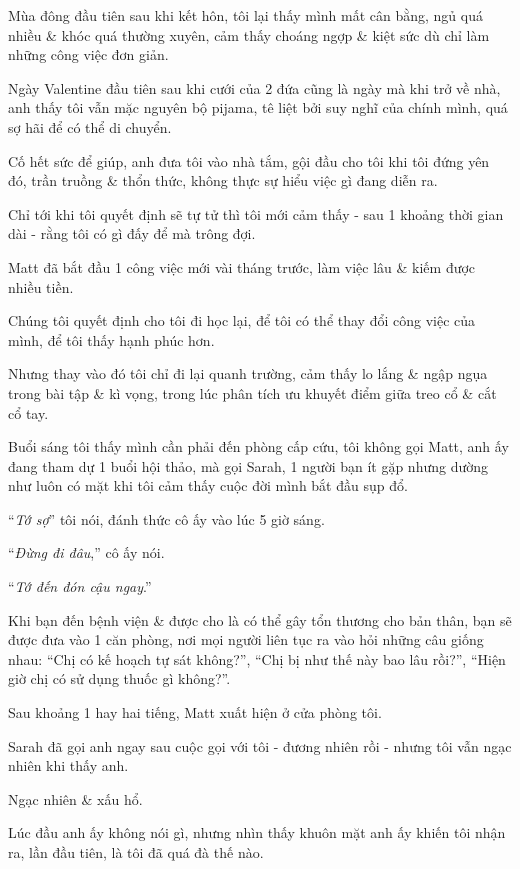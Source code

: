 \documentclass{article}
\begin{document}
Mùa đông đầu tiên sau khi kết hôn, tôi lại thấy mình mất cân bằng, ngủ quá nhiều \& khóc quá thường xuyên, cảm thấy choáng ngợp \& kiệt sức dù chỉ làm những công việc đơn giản.

%
Ngày Valentine đầu tiên sau khi cưới của 2 đứa cũng là ngày mà khi trở về nhà, anh thấy tôi vẫn mặc nguyên bộ pijama, tê liệt bởi suy nghĩ của chính mình, quá sợ hãi để có thể di chuyển.

Cố hết sức để giúp, anh đưa tôi vào nhà tắm, gội đầu cho tôi khi tôi đứng yên đó, trần truồng \& thổn thức, không thực sự hiểu việc gì đang diễn ra.

Chỉ tới khi tôi quyết định sẽ tự tử thì tôi mới cảm thấy - sau 1 khoảng thời gian dài - rằng tôi có gì đấy để mà trông đợi.

Matt đã bắt đầu 1 công việc mới vài tháng trước, làm việc lâu \& kiếm được nhiều tiền.

Chúng tôi quyết định cho tôi đi học lại, để tôi có thể thay đổi công việc của mình, để tôi thấy hạnh phúc hơn.

Nhưng thay vào đó tôi chỉ đi lại quanh trường, cảm thấy lo lắng \& ngập ngụa trong bài tập \& kì vọng, trong lúc phân tích ưu khuyết điểm giữa treo cổ \& cắt cổ tay.

%
Buổi sáng tôi thấy mình cần phải đến phòng cấp cứu, tôi không gọi Matt, anh ấy đang tham dự 1 buổi hội thảo, mà gọi Sarah, 1 người bạn ít gặp nhưng dường như luôn có mặt khi tôi cảm thấy cuộc đời mình bắt đầu sụp đổ.

%
``\textit{Tớ sợ}'' tôi nói, đánh thức cô ấy vào lúc 5 giờ sáng.

%
``\textit{Đừng đi đâu},'' cô ấy nói.

``\textit{Tớ đến đón cậu ngay}.''

%
Khi bạn đến bệnh viện \& được cho là có thể gây tổn thương cho bản thân, bạn sẽ được đưa vào 1 căn phòng, nơi mọi người liên tục ra vào hỏi những câu giống nhau: “Chị có kế hoạch tự sát không?”, “Chị bị như thế này bao lâu rồi?”, “Hiện giờ chị có sử dụng thuốc gì không?”.

%
Sau khoảng 1 hay hai tiếng, Matt xuất hiện ở cửa phòng tôi.

Sarah đã gọi anh ngay sau cuộc gọi với tôi - đương nhiên rồi - nhưng tôi vẫn ngạc nhiên khi thấy anh.

Ngạc nhiên \& xấu hổ.

%
Lúc đầu anh ấy không nói gì, nhưng nhìn thấy khuôn mặt anh ấy khiến tôi nhận ra, lần đầu tiên, là tôi đã quá đà thế nào.
\end{document}
